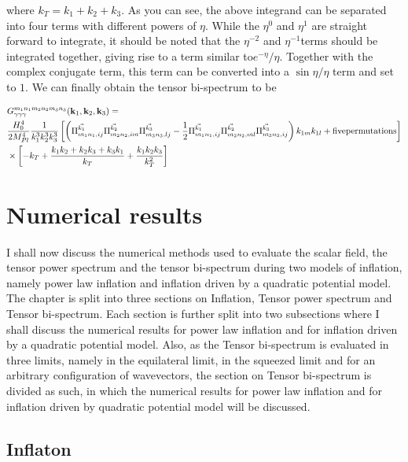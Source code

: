 \documentclass[12pt,a4paper,oneside]{book}
\begin{document}
\noindent where $k_T = k_1 +k_2 +k_3$. As you can see, the above integrand can be separated into four terms 
with different powers of $\eta$. While the $\eta^0$ and $\eta^1$ are straight forward to integrate, it should 
be noted that the $\eta^{-2}$ and $\eta^{-1}$terms should be integrated together, giving rise to a term similar 
to$e^{-\eta}/\eta$. Together with the complex conjugate term, this term can be converted into a 
$\sin \eta/\eta$ term and set to $1$. We can finally obtain the tensor bi-spectrum to be 

\begin{align*}
& G_{\gamma\gamma\gamma}^{m_1n_1m_2n_2m_3n_3}({\bf k}_1, {\bf k}_2, {\bf k}_3) = \\
& \frac{H_0^4}{2M_{Pl}^4}\frac{1}{k_1^3k_2^3k_3^3}
\left[\left(
\Pi^{\vec{k_1}}_{m_1n_1,ij}\Pi^{\vec{k_2}}_{m_2n_2,im}\Pi^{\vec{k_3}}_{m_3n_3,lj} 
-\frac{1}{2}\Pi^{\vec{k_1}}_{m_1n_1,ij}\Pi^{\vec{k_2}}_{m_2n_2,ml}\Pi^{\vec{k_3}}_{m_3n_3,ij}
\right)k_{1m}k_{1l} + {\rm five} {\rm permutations}\right]\\
& \times\left[-k_T +\frac{k_1k_2 +k_2k_3 + k_3k_1}{k_T} + \frac{k_1k_2k_3}{k_T^2}\right]
\end{align*}


\chapter{Numerical results}

I shall now discuss the numerical methods used to evaluate the scalar field,
the tensor power spectrum and the tensor bi-spectrum during two models 
of inflation, namely power law inflation and inflation driven by a quadratic potential 
model. The chapter is split into three sections on Inflation, Tensor power spectrum 
and Tensor bi-spectrum. Each section is further split into two subsections where I 
shall discuss the numerical results for power law inflation and for inflation driven by 
a quadratic potential model. Also, as the Tensor bi-spectrum is evaluated in three 
limits, namely in the equilateral limit, in the squeezed limit and for an arbitrary configuration 
of wavevectors, the section on Tensor bi-spectrum is divided as such, in which 
the numerical results for power law inflation and for inflation driven by quadratic 
potential model will be discussed.

\section{Inflaton}
\end{document}
